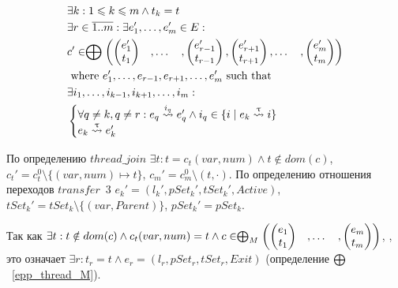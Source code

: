 \begin{align}
& \exists k : 1 \leqslant k \leqslant m \land t_k = t \nonumber \\
& \exists r \in \overline{1..m}: \exists e_1', \dots, e_m' \in E: \nonumber \\
& c' \in \mathrel{\bigoplus}
\begin{pmatrix}
\begin{pmatrix}
e_1' \\
t_1 
\end{pmatrix}& ,
\dots& ,
\begin{pmatrix}
e_{r-1}' \\
t_{r-1} 
\end{pmatrix} ,
\begin{pmatrix}
e_{r+1}' \\
t_{r+1} 
\end{pmatrix},
\dots& ,
\begin{pmatrix}
e_m' \\
t_m 
\end{pmatrix}
\end{pmatrix} \nonumber \\
& \mbox{ where } e_1', \dots, e_{r-1}, e_{r+1}, \dots, e_m' \mbox{ such that } \nonumber \\
&\exists i_1, \dots, i_{k-1}, i_{k+1}, \dots, i_m: \nonumber \\
&
\begin{cases}
\forall q \neq k, q \neq r: e_q \stackrel{i_q}{\leadsto} e_q' \land i_q \in \{i \mid e_k \stackrel{\uptau}{\leadsto} i\} \\
e_k \stackrel{\uptau}{\leadsto} e_k'
\end{cases} \nonumber 
\end{align}

По определению $thread\_join$
$\exists t: t = c_t(var, num) \land t \notin dom(c)$, $c_t' = c^0_t \setminus \{(var, num) \mapsto t\}$, $c_m' = c^0_m \setminus (t, \cdot)$.
По определению отношения переходов $transfer$~3
$e_k' = (l_k', pSet_k', tSet_k', Active)$, $tSet_k' = tSet_k \setminus \{(var, Parent)\}$, $pSet_k' = pSet_k$.

Так как $\exists t: t \notin dom(c) \land c_t(var, num) = t \land c \in \mathrel{\bigoplus}_M
\begin{pmatrix}
\begin{pmatrix}
e_1 \\
t_1 
\end{pmatrix}& ,
\dots& ,
\begin{pmatrix}
e_m \\
t_m 
\end{pmatrix}
\end{pmatrix}$, 
, это означает $\exists r: t_r = t \land e_r = (l_r, pSet_r, tSet_r, Exit)$ (определение $\mathrel{\bigoplus}$~\ref{epp_thread_M}).

